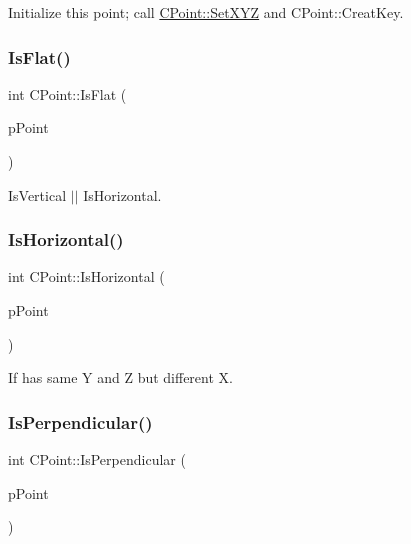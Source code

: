 Initialize this point; call \mbox{\hyperlink{classCPoint_ae8364b4fc6b31f4a844f38a13f2251c7}{C\+Point\+::\+Set\+X\+YZ}} and C\+Point\+::\+Creat\+Key. \mbox{\label{classCPoint_a8177f7cd02cfad8b3ac91ebf0b7c8eee}} 
\subsubsection{\texorpdfstring{IsFlat()}{IsFlat()}}
{\footnotesize\ttfamily int C\+Point\+::\+Is\+Flat (\begin{DoxyParamCaption}\item[{\mbox{\hyperlink{classCPoint}{C\+Point}} $\ast$}]{p\+Point }\end{DoxyParamCaption})}



Is\+Vertical $\vert$$\vert$ Is\+Horizontal. 

\mbox{\label{classCPoint_a44e549d9e95bb88d0abbe614ab5f1435}} 
\subsubsection{\texorpdfstring{IsHorizontal()}{IsHorizontal()}}
{\footnotesize\ttfamily int C\+Point\+::\+Is\+Horizontal (\begin{DoxyParamCaption}\item[{\mbox{\hyperlink{classCPoint}{C\+Point}} $\ast$}]{p\+Point }\end{DoxyParamCaption})}



If has same Y and Z but different X. 

\mbox{\label{classCPoint_a9ae0796ca1d732df8bf718c07e998e41}} 
\subsubsection{\texorpdfstring{IsPerpendicular()}{IsPerpendicular()}}
{\footnotesize\ttfamily int C\+Point\+::\+Is\+Perpendicular (\begin{DoxyParamCaption}\item[{\mbox{\hyperlink{classCPoint}{C\+Point}} $\ast$}]{p\+Point }\end{DoxyParamCaption})}



